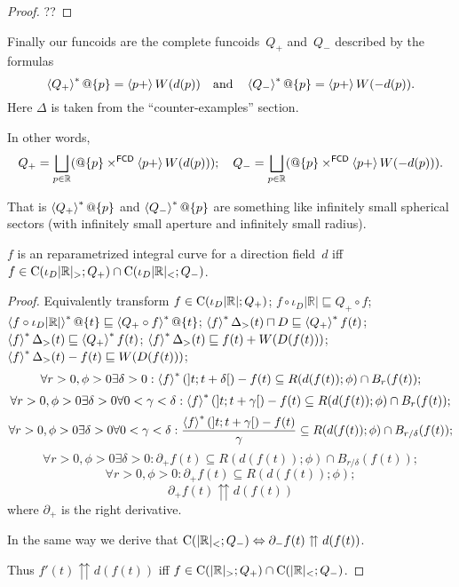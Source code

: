 \begin{proof}
??
\end{proof}

Finally our funcoids are the complete funcoids~$Q_+$ and~$Q_-$ described by the formulas
\[
\left\langle Q_+\right\rangle ^{\ast}@\{p\} = \left\langle p+\right\rangle W(d(p)) \quad\text{and}\quad \left\langle Q_-\right\rangle ^{\ast}@\{p\} = \left\langle p+\right\rangle W(-d(p)).
\]
Here $\Delta$ is taken from the ``counter-examples'' section.

In other words,
\[
Q_+ = \bigsqcup_{p\in\mathbb{R}} (@\{p\}\times^{\mathsf{FCD}}\supfun{p+}{W(d(p))});
\quad
Q_- = \bigsqcup_{p\in\mathbb{R}} (@\{p\}\times^{\mathsf{FCD}}\supfun{p+}{W(-d(p))}).
\]

That is $\left\langle Q_+\right\rangle ^{\ast}@\{p\}$ and $\left\langle Q_-\right\rangle ^{\ast}@\{p\}$ are something like infinitely small spherical sectors
(with infinitely small aperture and infinitely small radius).



\begin{thm}
$f$ is an reparametrized integral curve for a direction field~$d$ iff
$f\in\mathrm{C}(\iota_D|\mathbb{R}|_{>};Q_+)\cap\mathrm{C}(\iota_D|\mathbb{R}|_{<};Q_-)$.
\end{thm}

\begin{proof}
Equivalently transform $f\in\mathrm{C}(\iota_D|\mathbb{R}|;Q_+)$; $f\circ \iota_D|\mathbb{R}|\sqsubseteq Q_+\circ f$;
$\left\langle f\circ \iota_D|\mathbb{R}|\right\rangle ^{\ast}@\{t\}\sqsubseteq \left\langle Q_+\circ f\right\rangle ^{\ast}@\{t\}$;
$\left\langle f\right\rangle ^{\ast}\Delta_{>}(t)\sqcap D\sqsubseteq \left\langle Q_+\right\rangle ^{\ast}f(t)$;
$\left\langle f\right\rangle ^{\ast}\Delta_{>}(t)\sqsubseteq \left\langle Q_+\right\rangle ^{\ast}f(t)$;
$\left\langle f\right\rangle ^{\ast}\Delta_{>}(t)\sqsubseteq f(t)+W(D(f(t)))$;
$\left\langle f\right\rangle ^{\ast}\Delta_{>}(t)-f(t)\sqsubseteq W(D(f(t)))$;
\[ \forall r>0, \phi>0 \exists\delta>0: \left\langle f\right\rangle ^{\ast}(]t;t+\delta[)-f(t)\subseteq R(d(f(t));\phi) \cap B_r(f(t)); \]
\[ \forall r>0, \phi>0 \exists\delta>0 \forall 0<\gamma<\delta: \left\langle f\right\rangle ^{\ast}(]t;t+\gamma[)-f(t)\subseteq R(d(f(t));\phi) \cap B_r(f(t)); \]
\[ \forall r>0, \phi>0 \exists\delta>0 \forall 0<\gamma<\delta: \frac{\left\langle f\right\rangle ^{\ast}(]t;t+\gamma[)-f(t)}{\gamma}\subseteq R(d(f(t));\phi) \cap B_{r/\delta}(f(t)); \]
\[ \forall r>0, \phi>0 \exists\delta>0: \partial_+ f(t)\subseteq R(d(f(t));\phi) \cap B_{r/\delta}(f(t)); \]
\[ \forall r>0, \phi>0: \partial_+ f(t)\subseteq R(d(f(t));\phi); \]
\[ \partial_+ f(t) \upuparrows d(f(t)) \]
where $\partial_+$ is the right derivative.

In the same way we derive that $\mathrm{C}(|\mathbb{R}|_{<};Q_-)\Leftrightarrow \partial_- f(t) \upuparrows d(f(t))$.

Thus $f'(t) \upuparrows d(f(t))$ iff $f\in\mathrm{C}(|\mathbb{R}|_{>};Q_+)\cap\mathrm{C}(|\mathbb{R}|_{<};Q_-)$.
\end{proof}

